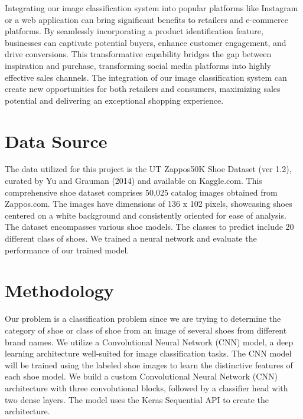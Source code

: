 \documentclass[11pt,a4paper]{article}
\begin{document}
\noindent
Integrating our image classification system into popular platforms like Instagram or a web application can bring significant benefits to retailers and e-commerce platforms. By seamlessly incorporating a product identification feature, businesses can captivate potential buyers, enhance customer engagement, and drive conversions. This transformative capability bridges the gap between inspiration and purchase, transforming social media platforms into highly effective sales channels. The integration of our image classification system can create new opportunities for both retailers and consumers, maximizing sales potential and delivering an exceptional shopping experience. 

		
\section{Data Source} 
The data utilized for this project is the UT Zappos50K Shoe Dataset (ver 1.2), curated by Yu and Grauman (2014) and available on Kaggle.com. This comprehensive shoe dataset comprises 50,025 catalog images obtained from Zappos.com. The images have dimensions of 136 x 102 pixels, showcasing shoes centered on a white background and consistently oriented for ease of analysis. The dataset encompasses various shoe models. The classes to predict include 20 different class of shoes.  We trained a neural network and evaluate the performance of our trained model.  
		
\section{Methodology} 
Our problem is a classification problem since we are trying to determine the category of shoe or class of shoe from an image of several shoes from different brand names. We utilize a Convolutional Neural Network (CNN) model, a deep learning architecture well-suited for image classification tasks. The CNN model will be trained using the labeled shoe images to learn the distinctive features of each shoe model. We build a custom Convolutional Neural Network (CNN) architecture with three convolutional blocks, followed by a classifier head with two dense layers. The model uses the Keras Sequential API to create the architecture.
\end{document}
